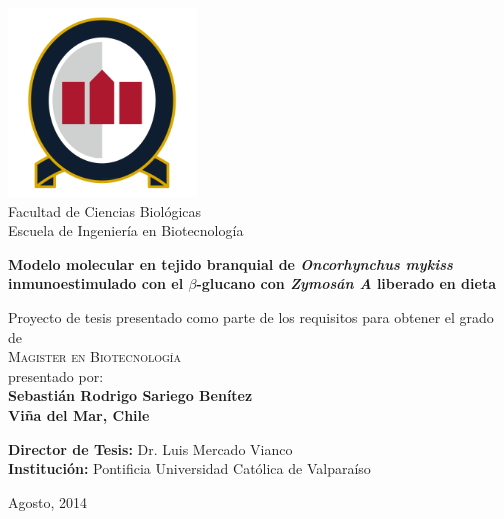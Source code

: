 \documentclass[12pt,letterpaper,oneside]{scrbook}
\date{}
\begin{document}
\begin{titlepage}
    \begin{center}
    
        
\includegraphics[width=5cm]{unab}\\
\vspace{0.1cm}
Facultad de Ciencias Biológicas\\
Escuela de Ingeniería en Biotecnología

        \vspace*{1cm}
        
       \large{ \textbf{Modelo molecular en tejido branquial de \emph{Oncorhynchus mykiss} inmunoestimulado con el $\beta$-glucano con \emph{Zymosán A} liberado en dieta}}
        
        \vspace{0.5cm}
        
        \vspace{1.5cm}
 
        Proyecto de tesis presentado como parte de los requisitos para obtener el grado de \\
        \large{\textsc{Magister en Biotecnología}}\\ 
        
        \vspace{2.5cm}        
        presentado por:\\
        \vspace{0.1cm} 
        \textbf{Sebastián Rodrigo Sariego Benítez}\\
        \textbf{Viña del Mar, Chile}
        
       
             
        
         \vspace{1.5cm}
         
    \textbf{Director de Tesis:} Dr. Luis Mercado Vianco\\
       \textbf{Institución:} Pontificia Universidad Católica de Valparaíso
         
       

        
        
 
        Agosto, 2014
        
 
 
     \end{center}
    \thispagestyle{empty}
\end{titlepage}
\end{document}
